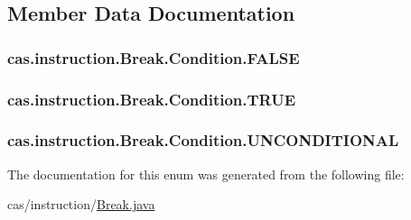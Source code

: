 \subsection{Member Data Documentation}
\hypertarget{enumcas_1_1instruction_1_1_break_1_1_condition_a2372c7e392b97589dc4ce34527beb277}{
\subsubsection[{F\-A\-L\-S\-E}]{\setlength{\rightskip}{0pt plus 5cm}cas.\-instruction.\-Break.\-Condition.\-F\-A\-L\-S\-E}}\label{enumcas_1_1instruction_1_1_break_1_1_condition_a2372c7e392b97589dc4ce34527beb277}
\hypertarget{enumcas_1_1instruction_1_1_break_1_1_condition_a7f89a8ea0cddc0f9378493ddb5d1a201}{
\subsubsection[{T\-R\-U\-E}]{\setlength{\rightskip}{0pt plus 5cm}cas.\-instruction.\-Break.\-Condition.\-T\-R\-U\-E}}\label{enumcas_1_1instruction_1_1_break_1_1_condition_a7f89a8ea0cddc0f9378493ddb5d1a201}
\hypertarget{enumcas_1_1instruction_1_1_break_1_1_condition_a2f5fc0c2168301cdf11006129bb573e0}{
\subsubsection[{U\-N\-C\-O\-N\-D\-I\-T\-I\-O\-N\-A\-L}]{\setlength{\rightskip}{0pt plus 5cm}cas.\-instruction.\-Break.\-Condition.\-U\-N\-C\-O\-N\-D\-I\-T\-I\-O\-N\-A\-L}}\label{enumcas_1_1instruction_1_1_break_1_1_condition_a2f5fc0c2168301cdf11006129bb573e0}


The documentation for this enum was generated from the following file\-:\begin{DoxyCompactItemize}
\item 
cas/instruction/\hyperlink{_break_8java}{Break.\-java}\end{DoxyCompactItemize}
